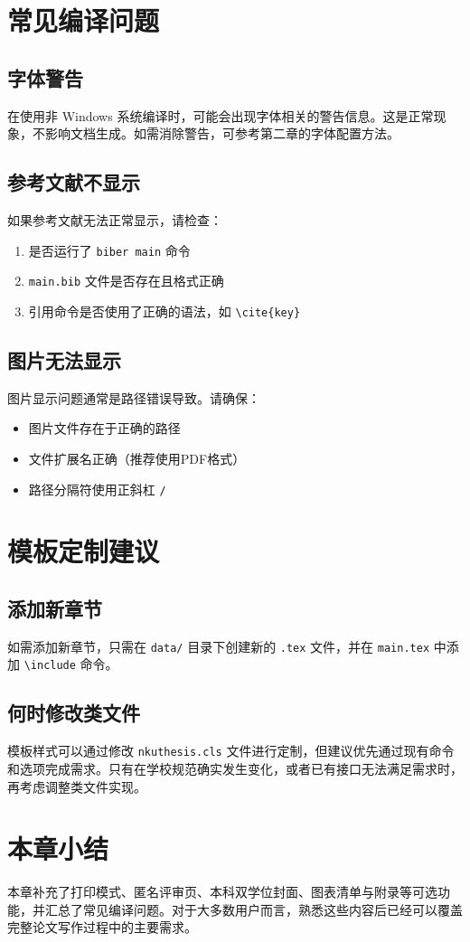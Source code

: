 \section{常见编译问题}

\subsection{字体警告}

在使用非 Windows 系统编译时，可能会出现字体相关的警告信息。这是正常现象，不影响文档生成。如需消除警告，可参考第二章的字体配置方法。

\subsection{参考文献不显示}

如果参考文献无法正常显示，请检查：

\begin{enumerate}
    \item 是否运行了 \texttt{biber main} 命令
    \item \texttt{main.bib} 文件是否存在且格式正确
    \item 引用命令是否使用了正确的语法，如 \texttt{\textbackslash cite\{key\}}
\end{enumerate}

\subsection{图片无法显示}

图片显示问题通常是路径错误导致。请确保：

\begin{itemize}
    \item 图片文件存在于正确的路径
    \item 文件扩展名正确（推荐使用PDF格式）
    \item 路径分隔符使用正斜杠 \texttt{/}
\end{itemize}

\section{模板定制建议}

\subsection{添加新章节}

如需添加新章节，只需在 \texttt{data/} 目录下创建新的 \texttt{.tex} 文件，并在 \texttt{main.tex} 中添加 \texttt{\textbackslash include} 命令。

\subsection{何时修改类文件}

模板样式可以通过修改 \texttt{nkuthesis.cls} 文件进行定制，但建议优先通过现有命令和选项完成需求。只有在学校规范确实发生变化，或者已有接口无法满足需求时，再考虑调整类文件实现。

\section{本章小结}

本章补充了打印模式、匿名评审页、本科双学位封面、图表清单与附录等可选功能，并汇总了常见编译问题。对于大多数用户而言，熟悉这些内容后已经可以覆盖完整论文写作过程中的主要需求。
